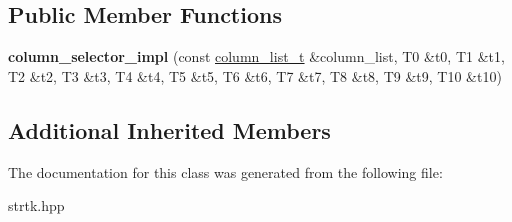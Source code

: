 \subsection*{Public Member Functions}
\begin{DoxyCompactItemize}
\item 
\hypertarget{classstrtk_1_1details_1_1column__selector__impl_3_01T0_00_01T1_00_01T2_00_01T3_00_01T4_00_01T5_0c1c6bb8abfc5930b575d229537727fec_ab511b82c96e5c3f45a16ab8050902ba1}{{\bfseries column\-\_\-selector\-\_\-impl} (const \hyperlink{structstrtk_1_1details_1_1column__list__impl}{column\-\_\-list\-\_\-t} \&column\-\_\-list, T0 \&t0, T1 \&t1, T2 \&t2, T3 \&t3, T4 \&t4, T5 \&t5, T6 \&t6, T7 \&t7, T8 \&t8, T9 \&t9, T10 \&t10)}\label{classstrtk_1_1details_1_1column__selector__impl_3_01T0_00_01T1_00_01T2_00_01T3_00_01T4_00_01T5_0c1c6bb8abfc5930b575d229537727fec_ab511b82c96e5c3f45a16ab8050902ba1}

\end{DoxyCompactItemize}
\subsection*{Additional Inherited Members}


The documentation for this class was generated from the following file\-:\begin{DoxyCompactItemize}
\item 
strtk.\-hpp\end{DoxyCompactItemize}
